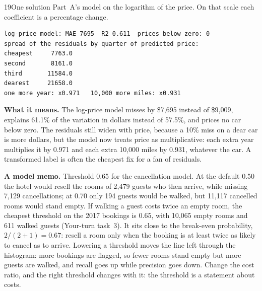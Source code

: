 \begin{labquestion}{19}{One solution}
Part~A's model on the logarithm of the price. On that scale each coefficient is a percentage change.
\end{labquestion}
\begin{labanswer}

\begin{refoutput}
\begin{lstlisting}[style=utpterminal]
log-price model: MAE 7695  R2 0.611  prices below zero: 0
spread of the residuals by quarter of predicted price:
cheapest     7763.0
second       8161.0
third       11584.0
dearest     21658.0
one more year: x0.971   10,000 more miles: x0.931
\end{lstlisting}
\end{refoutput}

\textbf{What it means.} The log-price model misses by \$7,695 instead of \$9,009, explains 61.1\% of the variation in dollars instead of 57.5\%, and prices no car below zero. The residuals still widen with price, because a 10\% miss on a dear car is more dollars, but the model now treats price as multiplicative: each extra year multiplies it by 0.971 and each extra 10,000 miles by 0.931, whatever the car. A transformed label is often the cheapest fix for a fan of residuals.

\textbf{A model memo.} Threshold 0.65 for the cancellation model. At the default 0.50 the hotel would resell the rooms of 2,479 guests who then arrive, while missing 7,129 cancellations; at 0.70 only 194 guests would be walked, but 11,117 cancelled rooms would stand empty. If walking a guest costs twice an empty room, the cheapest threshold on the 2017 bookings is 0.65, with 10,065 empty rooms and 611 walked guests (Your-turn task~3). It sits close to the break-even probability, $2/(2+1)=0.67$: resell a room only when the booking is at least twice as likely to cancel as to arrive. Lowering a threshold moves the line left through the histogram: more bookings are flagged, so fewer rooms stand empty but more guests are walked, and recall goes up while precision goes down. Change the cost ratio, and the right threshold changes with it: the threshold is a statement about costs.
\end{labanswer}


